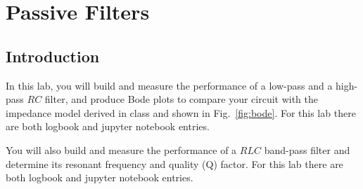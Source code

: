 \chapter{Passive Filters}

\section{Introduction}

In this lab, you will build and measure the performance of a low-pass
and a high-pass $RC$ filter, and produce Bode plots to compare your
circuit with the impedance model derived in class and shown in
Fig.~\ref{fig:bode}.  For this lab there are both logbook and jupyter notebook entries.


You will also  build and measure the performance of a $RLC$ band-pass filter and determine its resonant frequency and quality (Q) factor. For this lab there are both logbook and jupyter notebook entries.


